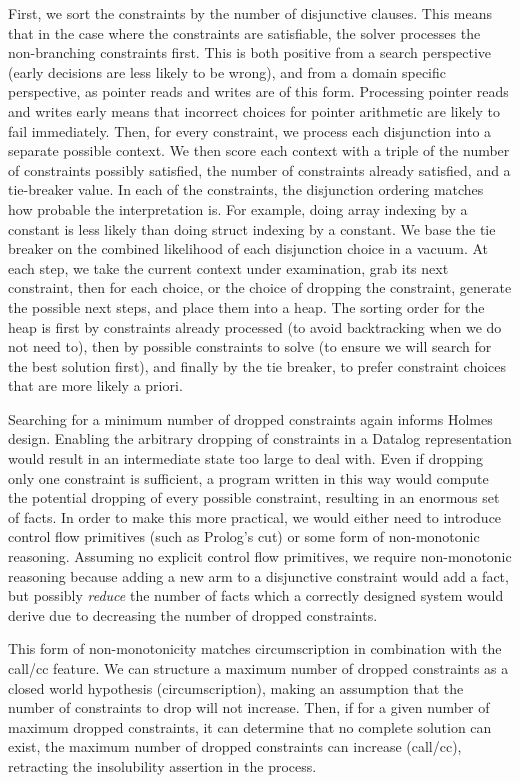 First, we sort the constraints by the number of disjunctive clauses. This means that in the case where the constraints are satisfiable, the solver processes the non-branching constraints first. This is both positive from a search perspective (early decisions are less likely to be wrong), and from a domain specific perspective, as pointer reads and writes are of this form. Processing pointer reads and writes early means that incorrect choices for pointer arithmetic are likely to fail immediately.
Then, for every constraint, we process each disjunction into a separate possible context. We then score each context with a triple of the number of constraints possibly satisfied, the number of constraints already satisfied, and a tie-breaker value.
In each of the constraints, the disjunction ordering matches how probable the interpretation is. For example, doing array indexing by a constant is less likely than doing struct indexing by a constant.
We base the tie breaker on the combined likelihood of each disjunction choice in a vacuum.
At each step, we take the current context under examination, grab its next constraint, then for each choice, or the choice of dropping the constraint, generate the possible next steps, and place them into a heap. The sorting order for the heap is first by constraints already processed (to avoid backtracking when we do not need to), then by possible constraints to solve (to ensure we will search for the best solution first), and finally by the tie breaker, to prefer constraint choices that are more likely a priori.

Searching for a minimum number of dropped constraints again informs Holmes design.
Enabling the arbitrary dropping of constraints in a Datalog representation would result in an intermediate state too large to deal with.
Even if dropping only one constraint is sufficient, a program written in this way would compute the potential dropping of every possible constraint, resulting in an enormous set of facts.
In order to make this more practical, we would either need to introduce control flow primitives (such as Prolog's cut) or some form of non-monotonic reasoning.
Assuming no explicit control flow primitives, we require non-monotonic reasoning because adding a new arm to a disjunctive constraint would add a fact, but possibly \emph{reduce} the number of facts which a correctly designed system would derive due to decreasing the number of dropped constraints.

This form of non-monotonicity matches circumscription in combination with the call/cc feature.
We can structure a maximum number of dropped constraints as a closed world hypothesis (circumscription), making an assumption that the number of constraints to drop will not increase.
Then, if for a given number of maximum dropped constraints, it can determine that no complete solution can exist, the maximum number of dropped constraints can increase (call/cc), retracting the insolubility assertion in the process.

